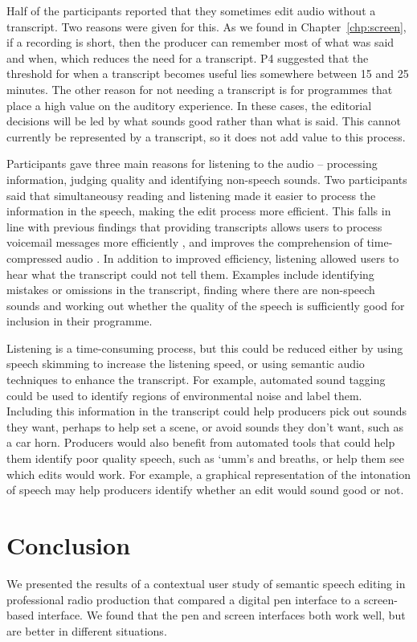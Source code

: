Half of the participants reported that they sometimes edit audio without a transcript. Two reasons were given for
this. As we found in Chapter~\ref{chp:screen}, if a recording is short, then the producer can remember most of what was
said and when, which reduces the need for a transcript. P4 suggested that the threshold for when a transcript becomes
useful lies somewhere between 15 and 25 minutes. The other reason for not needing a transcript is for programmes that
place a high value on the auditory experience. In these cases, the editorial decisions will be led by what sounds good
rather than what is said. This cannot currently be represented by a transcript, so it does not add value to this
process.

Participants gave three main reasons for listening to the audio -- processing information, judging quality and
identifying non-speech sounds. Two participants said that simultaneousy reading and listening made it easier to process
the information in the speech, making the edit process more efficient. This falls in line with previous findings that
providing transcripts allows users to process voicemail messages more efficiently \citep{Whittaker2002}, and improves
the comprehension of time-compressed audio \citep{Vemuri2004}. In addition to improved efficiency, listening allowed
users to hear what the transcript could not tell them. Examples include identifying mistakes or omissions in the
transcript, finding where there are non-speech sounds and working out whether the quality of the speech is sufficiently
good for inclusion in their programme.

Listening is a time-consuming process, but this could be reduced either by using speech skimming \citep{Arons1997} to
increase the listening speed, or using semantic audio techniques to enhance the transcript. For example, automated
sound tagging \citep{Duan2014} could be used to identify regions of environmental noise and label them. Including this
information in the transcript could help producers pick out sounds they want, perhaps to help set a scene, or avoid
sounds they don't want, such as a car horn. Producers would also benefit from automated tools that could help them
identify poor quality speech, such as `umm's and breaths, or help them see which edits would work.  For example, a
graphical representation of the intonation of speech may help producers identify whether an edit would sound good or
not.

\section{Conclusion}\label{sec:paper-conclusion}
We presented the results of a contextual user study of semantic speech editing in professional radio production that
compared a digital pen interface to a screen-based interface.  We found that the pen and screen interfaces both work
well, but are better in different situations.

